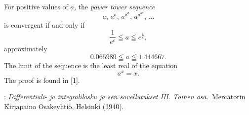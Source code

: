 \documentclass[12pt]{article}
\theoremstyle{definition}
\begin{document}
For positive values of $a$, the {\em power tower sequence}
              $$a,\, a^a,\, a^{a^a},\, a^{a^{a^a}},\, \ldots$$
is convergent if and only if
               $$\frac{1}{e^e} \leqq a \leqq e^{\frac{1}{e}},$$
approximately 
                  $$0.065989\leqq a \leqq 1.444667.$$
The limit of the sequence is the least real  of the equation
                           $$a^x = x.$$
The proof is found in [1].

\begin{thebibliography}{8}
: {\em Differentiali- ja integralilasku
ja sen sovellutukset III. Toinen osa.}\, Mercatorin Kirjapaino Osakeyhti\"o, Helsinki (1940).
\end{thebibliography}
\end{document}
